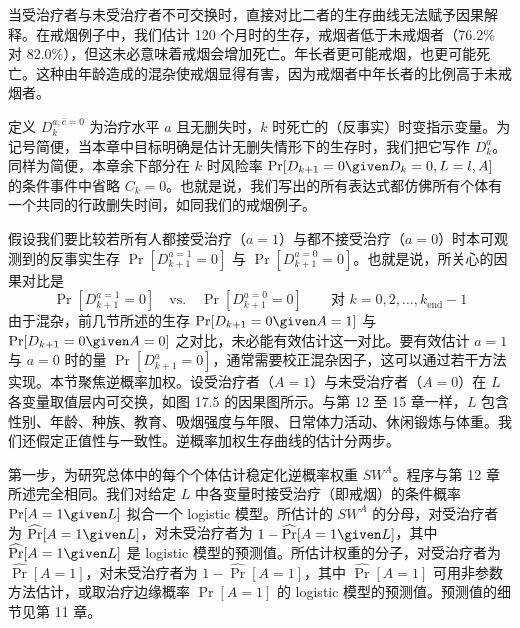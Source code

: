 当受治疗者与未受治疗者不可交换时，直接对比二者的生存曲线无法赋予因果解释。在戒烟例子中，我们估计 120 个月时的生存，戒烟者低于未戒烟者（76.2\% 对 82.0\%），但这未必意味着戒烟会增加死亡。年长者更可能戒烟，也更可能死亡。这种由年龄造成的混杂使戒烟显得有害，因为戒烟者中年长者的比例高于未戒烟者。

定义 $D_k^{a,\bar c=0}$ 为治疗水平 $a$ 且无删失时，$k$ 时死亡的（反事实）时变指示变量。为记号简便，当本章中目标明确是估计无删失情形下的生存时，我们把它写作 $D_k^a$。同样为简便，本章余下部分在 $k$ 时风险率 $\Pr[D_{k+1}=0\given D_k=0,L=l,A]$ 的条件事件中省略 $C_k=0$。也就是说，我们写出的所有表达式都仿佛所有个体有一个共同的行政删失时间，如同我们的戒烟例子。

假设我们要比较若所有人都接受治疗（$a=1$）与都不接受治疗（$a=0$）时本可观测到的反事实生存 $\Pr[D_{k+1}^{a=1}=0]$ 与 $\Pr[D_{k+1}^{a=0}=0]$。也就是说，所关心的因果对比是
\[
\Pr[D_{k+1}^{a=1}=0]\quad\text{vs.}\quad\Pr[D_{k+1}^{a=0}=0]\qquad\text{对 }k=0,2,\dots,k_{\text{end}}-1
\]
由于混杂，前几节所述的生存 $\Pr[D_{k+1}=0\given A=1]$ 与 $\Pr[D_{k+1}=0\given A=0]$ 之对比，未必能有效估计这一对比。要有效估计 $a=1$ 与 $a=0$ 时的量 $\Pr[D_{k+1}^a=0]$，通常需要校正混杂因子，这可以通过若干方法实现。本节聚焦逆概率加权。设受治疗者（$A=1$）与未受治疗者（$A=0$）在 $L$ 各变量取值层内可交换，如图 17.5 的因果图所示。与第 12 至 15 章一样，$L$ 包含性别、年龄、种族、教育、吸烟强度与年限、日常体力活动、休闲锻炼与体重。我们还假定正值性与一致性。逆概率加权生存曲线的估计分两步。

\begin{figure}[htbp]
\centering
{}
\caption{}
\label{fig:17.5}
\end{figure}

第一步，为研究总体中的每个个体估计稳定化逆概率权重 $SW^A$。程序与第 12 章所述完全相同。我们对给定 $L$ 中各变量时接受治疗（即戒烟）的条件概率 $\Pr[A=1\given L]$ 拟合一个 logistic 模型。所估计的 $SW^A$ 的分母，对受治疗者为 $\widehat{\Pr}[A=1\given L]$，对未受治疗者为 $1-\widehat{\Pr}[A=1\given L]$，其中 $\widehat{\Pr}[A=1\given L]$ 是 logistic 模型的预测值。所估计权重的分子，对受治疗者为 $\widehat{\Pr}[A=1]$，对未受治疗者为 $1-\widehat{\Pr}[A=1]$，其中 $\widehat{\Pr}[A=1]$ 可用非参数方法估计，或取治疗边缘概率 $\Pr[A=1]$ 的 logistic 模型的预测值。预测值的细节见第 11 章。

